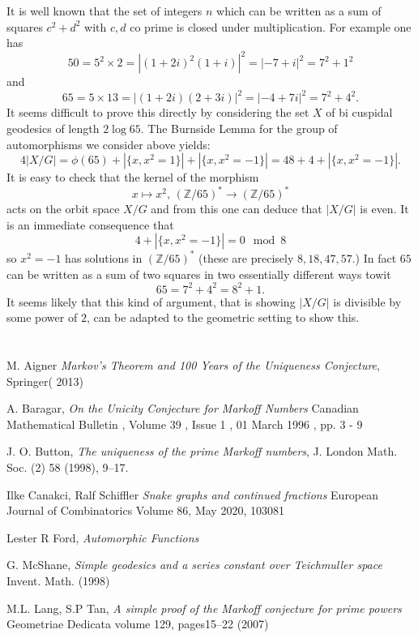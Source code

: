 \documentclass[12pt,a4paper]{amsart}
\def\ZZ{\mathbb{Z}}
\begin{document}
It is well known that the set of integers $n$ 
which can be written as a sum of squares 
$c^2 + d^2$ with $c,d$ co prime is closed under multiplication.
For example one has
$$50 = 5^2 \times 2 = | (1+2i)^2 (1+i) |^2 = |  -7 + i |^2 = 7^2 + 1^2 $$
and
$$65 = 5 \times 13 = | (1+2i)(2+3 i) |^2 = |  -4 + 7i |^2 = 7^2 + 4^2.$$
It seems difficult to prove this directly by considering 
the set $X$ of bi cuspidal  geodesics of length $2\log 65$.
The Burnside Lemma for the group of automorphisms we consider above yields:
$$4 |X/G|   = \phi(65)+  |\{ x, x^2 = 1 \}| + |\{ x, x^2 = -1 \}| = 48 + 4 +  |\{ x, x^2 = -1 \}|.$$
It is easy to check that the 
kernel of the morphism 
$$x \mapsto x^2,\, (\ZZ/65)^* \rightarrow (\ZZ/65)^*$$
acts on the orbit space $X/G$
and from this one can deduce that $|X/G|$ is even.
It is an immediate consequence that 
$$ 4 +  |\{ x, x^2 = -1 \}| = 0 \mod 8 $$
so $x^2 = -1$ 
has solutions in $(\ZZ/65)^*$
(these are precisely  $8,18,47,57$.)
In fact $65$ can be written as a sum of two  squares 
in two essentially different ways towit
$$ 65 =  7^2 + 4^2 = 8^2 + 1.$$
It seems likely that this kind of argument,
that is showing $|X/G|$ is divisible by some power of $2$,
can be adapted to the geometric setting to show this.


\section{}

M. Aigner
\textit{Markov's Theorem and 100 Years of the Uniqueness Conjecture}, Springer( 2013)

A. Baragar,
\textit{On the Unicity Conjecture for Markoff Numbers}
Canadian Mathematical Bulletin , Volume 39 , Issue 1 , 01 March 1996 , pp. 3 - 9

J. O. Button, 
\textit{The uniqueness of the prime Markoff numbers},
 J. London Math. Soc.
(2) 58 (1998), 9–17.

Ilke Canakci, Ralf Schiffler
\textit{Snake graphs and continued fractions}
European Journal of Combinatorics
Volume 86, May 2020, 103081


Lester R Ford,
\textit{Automorphic Functions}

G. McShane,
\textit{Simple geodesics and a series constant over Teichmuller space}
Invent. Math. (1998)

M.L. Lang, S.P Tan,
\textit{A simple proof of the Markoff conjecture for prime powers}
Geometriae Dedicata volume 129, pages15–22 (2007)
\end{document}
